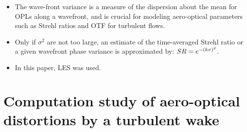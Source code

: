 \begin{itemize}
            \item The wave-front variance is a measure of the dispersion about the mean for OPLs along a wavefront, and is crucial for modeling aero-optical parameters such as Strehl ratios and OTF for turbulent flows. 
            \item Only if $\sigma^2$ are not too large, an estimate of the time-averaged Strehl ratio or a given wavefront phase variance is approximated by: $ SR = e^{-\left(k\sigma\right)^2} $. 
            \item In this paper, LES was used. 
        \end{itemize}


    \section{Computation study of aero-optical distortions by a turbulent wake \cite{mani:aiaa:2005}}
